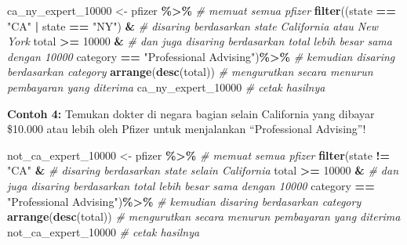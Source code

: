 \documentclass[
]{book}
\newenvironment{Shaded}{\begin{snugshade}}{\end{snugshade}}
\newcommand{\CommentTok}[1]{\textcolor[rgb]{0.56,0.35,0.01}{\textit{#1}}}
\newcommand{\DecValTok}[1]{\textcolor[rgb]{0.00,0.00,0.81}{#1}}
\newcommand{\FunctionTok}[1]{\textcolor[rgb]{0.13,0.29,0.53}{\textbf{#1}}}
\newcommand{\NormalTok}[1]{#1}
\newcommand{\OtherTok}[1]{\textcolor[rgb]{0.56,0.35,0.01}{#1}}
\newcommand{\SpecialCharTok}[1]{\textcolor[rgb]{0.81,0.36,0.00}{\textbf{#1}}}
\newcommand{\StringTok}[1]{\textcolor[rgb]{0.31,0.60,0.02}{#1}}
\begin{document}
\begin{Shaded}
\begin{Highlighting}[]
\NormalTok{ca\_ny\_expert\_10000 }\OtherTok{\textless{}{-}}\NormalTok{ pfizer }\SpecialCharTok{\%\textgreater{}\%}                  \CommentTok{\# memuat semua \textasciigrave{}pfizer\textasciigrave{}    }
  \FunctionTok{filter}\NormalTok{((state }\SpecialCharTok{==} \StringTok{"CA"} \SpecialCharTok{|}\NormalTok{ state }\SpecialCharTok{==} \StringTok{"NY"}\NormalTok{)  }\SpecialCharTok{\&}       \CommentTok{\# disaring berdasarkan \textasciigrave{}state\textasciigrave{} California atau New York}
\NormalTok{         total }\SpecialCharTok{\textgreater{}=} \DecValTok{10000} \SpecialCharTok{\&}                         \CommentTok{\# dan juga disaring berdasarkan \textasciigrave{}total\textasciigrave{} lebih besar sama dengan 10000}
\NormalTok{         category }\SpecialCharTok{==} \StringTok{"Professional Advising"}\NormalTok{)}\SpecialCharTok{\%\textgreater{}\%}  \CommentTok{\# kemudian disaring berdasarkan \textasciigrave{}category\textasciigrave{}}
  \FunctionTok{arrange}\NormalTok{(}\FunctionTok{desc}\NormalTok{(total))                            }\CommentTok{\# mengurutkan secara menurun pembayaran yang diterima}
\NormalTok{ca\_ny\_expert\_10000                                }\CommentTok{\# cetak hasilnya}
\end{Highlighting}
\end{Shaded}

\textbf{Contoh 4:} Temukan dokter di negara bagian selain California yang dibayar \$10.000 atau lebih oleh Pfizer untuk menjalankan ``Professional Advising''!

\begin{Shaded}
\begin{Highlighting}[]
\NormalTok{not\_ca\_expert\_10000 }\OtherTok{\textless{}{-}}\NormalTok{ pfizer }\SpecialCharTok{\%\textgreater{}\%}                 \CommentTok{\# memuat semua \textasciigrave{}pfizer\textasciigrave{}    }
  \FunctionTok{filter}\NormalTok{(state }\SpecialCharTok{!=} \StringTok{"CA"} \SpecialCharTok{\&}                          \CommentTok{\# disaring berdasarkan \textasciigrave{}state\textasciigrave{} selain California}
\NormalTok{         total }\SpecialCharTok{\textgreater{}=} \DecValTok{10000} \SpecialCharTok{\&}                         \CommentTok{\# dan juga disaring berdasarkan \textasciigrave{}total\textasciigrave{} lebih besar sama dengan 10000}
\NormalTok{         category }\SpecialCharTok{==} \StringTok{"Professional Advising"}\NormalTok{)}\SpecialCharTok{\%\textgreater{}\%}  \CommentTok{\# kemudian disaring berdasarkan \textasciigrave{}category\textasciigrave{}}
  \FunctionTok{arrange}\NormalTok{(}\FunctionTok{desc}\NormalTok{(total))                            }\CommentTok{\# mengurutkan secara menurun pembayaran yang diterima}
\NormalTok{not\_ca\_expert\_10000                               }\CommentTok{\# cetak hasilnya}
\end{Highlighting}
\end{Shaded}
\end{document}
